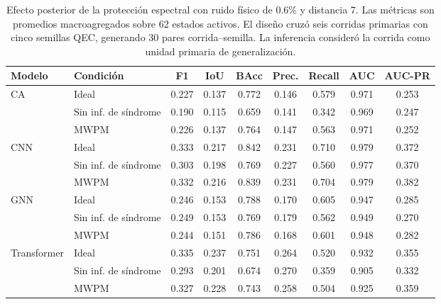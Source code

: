 \documentclass[fleqn,10pt]{wlscirep}
\begin{document}
\begin{table}[H]
\centering
\caption{Efecto posterior de la protección espectral con ruido físico de 0.6\% y distancia 7. Las métricas son promedios macroagregados sobre 62 estados activos. El diseño cruzó seis corridas primarias con cinco semillas QEC, generando 30 pares corrida--semilla. La inferencia consideró la corrida como unidad primaria de generalización.}
\label{tab:downstream}
\scriptsize
\setlength{\tabcolsep}{3.0pt}
\begin{tabular}{llccccccc}
\toprule
\textbf{Modelo} & \textbf{Condición} & \textbf{F1} & \textbf{IoU} & \textbf{BAcc} & \textbf{Prec.} & \textbf{Recall} & \textbf{AUC} & \textbf{AUC-PR}\\
\midrule
\multirow{3}{*}{CA} & Ideal & 0.227 & 0.137 & 0.772 & 0.146 & 0.579 & 0.971 & 0.253\\
 & Sin inf. de síndrome & 0.190 & 0.115 & 0.659 & 0.141 & 0.342 & 0.969 & 0.247\\
 & MWPM & 0.226 & 0.137 & 0.764 & 0.147 & 0.563 & 0.971 & 0.252\\
\midrule
\multirow{3}{*}{CNN} & Ideal & 0.333 & 0.217 & 0.842 & 0.231 & 0.710 & 0.979 & 0.372\\
 & Sin inf. de síndrome & 0.303 & 0.198 & 0.769 & 0.227 & 0.560 & 0.977 & 0.370\\
 & MWPM & 0.332 & 0.216 & 0.839 & 0.231 & 0.704 & 0.979 & 0.382\\
\midrule
\multirow{3}{*}{GNN} & Ideal & 0.246 & 0.153 & 0.788 & 0.170 & 0.605 & 0.947 & 0.285\\
 & Sin inf. de síndrome & 0.249 & 0.153 & 0.769 & 0.179 & 0.562 & 0.949 & 0.270\\
 & MWPM & 0.244 & 0.151 & 0.786 & 0.168 & 0.601 & 0.948 & 0.282\\
\midrule
\multirow{3}{*}{Transformer} & Ideal & 0.335 & 0.237 & 0.751 & 0.264 & 0.520 & 0.932 & 0.355\\
 & Sin inf. de síndrome & 0.293 & 0.201 & 0.674 & 0.270 & 0.359 & 0.905 & 0.332\\
 & MWPM & 0.327 & 0.228 & 0.743 & 0.258 & 0.504 & 0.925 & 0.359\\
\bottomrule
\end{tabular}
\end{table}
\end{document}
